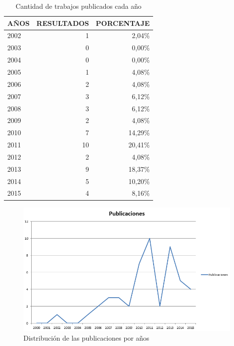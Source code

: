 \begin{table}
  \begin{center}
  \begin{tabular}{| m{4cm} | r | r |}
    \hline
    AÑOS & RESULTADOS & PORCENTAJE\\
    \hline    
    \hline
    2002 & 1 & 2,04\% \\
    \hline
    2003 & 0 & 0,00\% \\
    \hline
    2004 & 0 & 0,00\%\\
    \hline
    2005 & 1 & 4,08\%\\
    \hline
    2006 & 2 & 4,08\%\\
    \hline
    2007 & 3 & 6,12\%\\
    \hline
    2008 & 3 & 6,12\%\\
    \hline
    2009 & 2 & 4,08\%\\
    \hline
    2010 & 7 & 14,29\%\\
    \hline
    2011 & 10 & 20,41\%\\
    \hline
    2012 & 2 & 4,08\%\\
    \hline
    2013 & 9 & 18,37\% \\
    \hline
    2014 & 5 & 10,20\%\\
    \hline
    2015 & 4 & 8,16\% \\
    \hline
  \end{tabular}
\end{center}
\caption{Cantidad de trabajos publicados cada año}
\label{tab:ResumenAniosResultados}
\end{table}

\begin{figure}
  \begin{center}
    \includegraphics[scale=0.5]{PublicacionesAnuales.png}
  \end{center}
  \caption{Distribución de las publicaciones por años}
  \label{fig:PublicacionesAnuales}
\end{figure}


